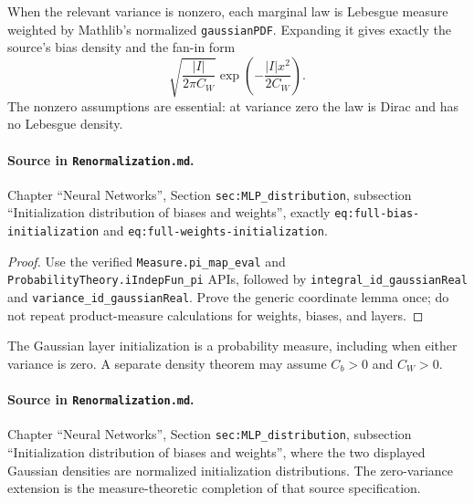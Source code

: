 \begin{lemma}
\label{lem:renorm:initDensities}
When the relevant variance is nonzero, each marginal law is Lebesgue measure weighted by Mathlib's
normalized \texttt{gaussianPDF}.  Expanding it gives exactly the source's bias density and the
fan-in form
\[
 \sqrt{\frac{|I|}{2\pi C_W}}
 \exp\!\left(-\frac{|I|x^2}{2C_W}\right).
\]
The nonzero assumptions are essential: at variance zero the law is Dirac and has no Lebesgue
density.

\paragraph{Source in \texttt{Renormalization.md}.}
Chapter ``Neural Networks'', Section \texttt{sec:MLP\_distribution}, subsection ``Initialization
distribution of biases and weights'', exactly \texttt{eq:full-bias-initialization} and
\texttt{eq:full-weights-initialization}.
\end{lemma}

\begin{proof}
Use the verified \texttt{Measure.pi\_map\_eval} and
\texttt{ProbabilityTheory.iIndepFun\_pi} APIs, followed by
\texttt{integral\_id\_gaussianReal} and \texttt{variance\_id\_gaussianReal}.  Prove the generic
coordinate lemma once; do not repeat product-measure calculations for weights, biases, and layers.
\end{proof}

\begin{lemma}
\label{lem:renorm:initProbability}
The Gaussian layer initialization is a probability measure, including when either variance is
zero.  A separate density theorem may assume $C_b>0$ and $C_W>0$.

\paragraph{Source in \texttt{Renormalization.md}.}
Chapter ``Neural Networks'', Section \texttt{sec:MLP\_distribution}, subsection ``Initialization
distribution of biases and weights'', where the two displayed Gaussian densities are normalized
initialization distributions.  The zero-variance extension is the measure-theoretic completion of
that source specification.
\end{lemma}

